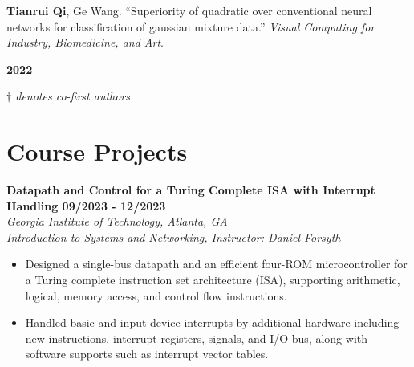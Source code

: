 \documentclass[letterpaper, 11pt]{article}
\newcommand{\subsectionvspace}{\vspace{8pt}}
\begin{document}
    \subsectionvspace

    \begin{minipage}[t]{0.9\textwidth} 
        \textbf{Tianrui Qi}, Ge Wang. 
        ``Superiority of quadratic over conventional neural networks for classification of gaussian mixture data.'' 
        \textit{Visual Computing for Industry, Biomedicine, and Art}.
    \end{minipage}%
    \begin{minipage}[t]{0.1\textwidth} \raggedleft
        \textbf{2022}
    \end{minipage}

    \subsectionvspace

    \textit{$\dag$ denotes co-first authors}


\section{Course Projects}




    \textbf{Datapath and Control for a Turing Complete ISA with Interrupt Handling \hfill 09/2023 - 12/2023} \\
    \textit{Georgia Institute of Technology, Atlanta, GA} \\
    \textit{Introduction to Systems and Networking, Instructor: Daniel Forsyth}
    \begin{itemize}
        \item Designed a single-bus datapath and an efficient four-ROM microcontroller for a Turing complete instruction set architecture (ISA), supporting arithmetic, logical, memory access, and control flow instructions.
        \item Handled basic and input device interrupts by additional hardware including new instructions, interrupt registers, signals, and I/O bus, along with software supports such as interrupt vector tables.
    \end{itemize}
\end{document}
